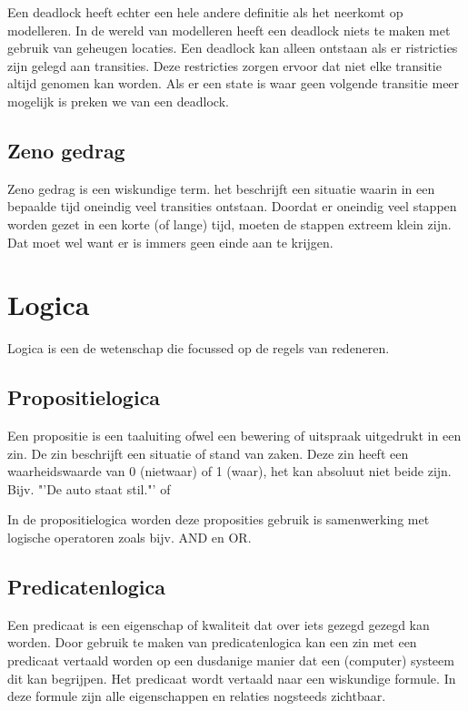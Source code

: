 \documentclass{article}%
\begin{document}
Een deadlock heeft echter een hele andere definitie als het neerkomt op modelleren. In de wereld van modelleren heeft een deadlock niets te maken met gebruik van geheugen locaties. Een deadlock kan alleen ontstaan als er ristricties zijn gelegd aan transities. Deze restricties zorgen ervoor dat niet elke transitie altijd genomen kan worden. Als er een state is waar geen volgende transitie meer mogelijk is preken we van een deadlock.

\subsection{Zeno gedrag}
Zeno gedrag is een wiskundige term. het beschrijft een situatie waarin in een bepaalde tijd oneindig veel transities ontstaan.\cite{sufficientconditions} Doordat er oneindig veel stappen worden gezet in een korte (of lange) tijd, moeten de stappen extreem klein zijn. Dat moet wel want er is immers geen einde aan te krijgen. 




\clearpage %




\section{Logica}
Logica is een de wetenschap die focussed op de regels van redeneren.
\subsection{Propositielogica}
Een propositie is een taaluiting ofwel een bewering of uitspraak uitgedrukt in een zin. De zin beschrijft een situatie of stand van zaken. 
Deze zin heeft een waarheidswaarde van 0 (nietwaar) of 1 (waar), het kan absoluut niet beide zijn. Bijv. "'De auto staat stil."' of 

In de propositielogica worden deze proposities gebruik is samenwerking met logische operatoren zoals bijv. AND en OR.\cite{propositionlogic}

\subsection{Predicatenlogica}
Een predicaat is een eigenschap of kwaliteit dat over iets gezegd gezegd kan worden. Door gebruik te maken van predicatenlogica kan een zin met een predicaat vertaald worden op een dusdanige manier dat een (computer) systeem dit kan begrijpen.
Het predicaat wordt vertaald naar een wiskundige formule. In deze formule zijn alle eigenschappen en relaties nogsteeds zichtbaar.
\end{document}
